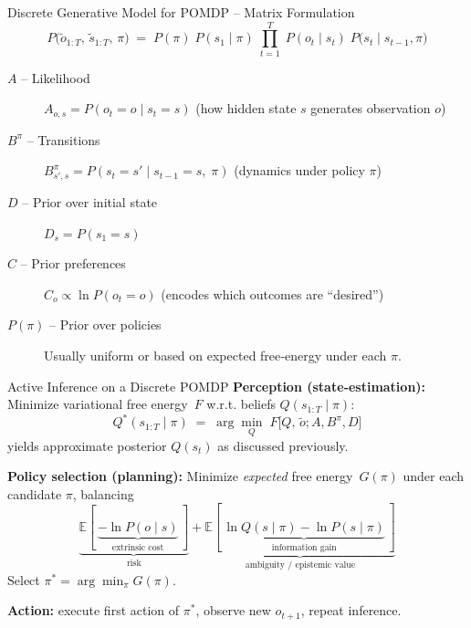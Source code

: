 \documentclass[aspectratio=1610, english]{beamer}
\begin{document}
\begin{frame}{Discrete Generative Model for POMDP -- Matrix Formulation}
\[
  P\bigl(\tilde o_{1:T},\,\tilde s_{1:T},\,\pi\bigr)
    \;=\;P(\pi)\;P(s_1\mid\pi)\;\prod_{t=1}^T
       \;P(o_t\mid s_t)\;P\bigl(s_t\mid s_{t-1},\pi\bigr)
\]
\medskip

\begin{description}
  \item[\(A\) – Likelihood]  
    \(A_{o,s} = P(o_t = o\mid s_t = s)\)  
    (how hidden state \(s\) generates observation \(o\))
  \item[\(B^\pi\) – Transitions]  
    \(B^\pi_{s',s} = P(s_t = s'\mid s_{t-1} = s,\;\pi)\)  
    (dynamics under policy \(\pi\))
  \item[\(D\) – Prior over initial state]  
    \(D_{s} = P(s_1 = s)\)
  \item[\(C\) – Prior preferences]  
    \(C_{o}\propto \ln P(o_t = o)\)  
    (encodes which outcomes are “desired”)
  \item[\(P(\pi)\) – Prior over policies]  
    Usually uniform or based on expected free‐energy under each \(\pi\).
\end{description}
\end{frame}

\begin{frame}{Active Inference on a Discrete POMDP}
\textbf{Perception (state‑estimation):}  
Minimize variational free energy \(F\) w.r.t. beliefs \(Q(s_{1:T}\!\mid\!\pi)\):
\[
  Q^*(s_{1:T}\!\mid\!\pi)
  \;=\;\arg\min_{Q}\;F\bigl[Q,\,\tilde o;A,B^\pi,D\bigr]
\]
yields approximate posterior \(Q(s_t)\) as discussed previously.

\medskip
\textbf{Policy selection (planning):}  
Minimize \emph{expected} free energy \(G(\pi)\) under each candidate \(\pi\),
balancing
\[
  \underbrace{\mathbb{E}[\,\underbrace{-\ln P(o\mid s)}_{\text{extrinsic cost}}\,]}_{\text{risk}}
  + 
  \underbrace{\mathbb{E}[\,\underbrace{\ln Q(s\mid\pi) - \ln P(s\mid\pi)}_{\text{information gain}}\,]}_{\text{ambiguity / epistemic value}}
\]
Select  
\(\displaystyle \pi^* = \arg\min_\pi G(\pi)\).

\medskip
\textbf{Action:} execute first action of \(\pi^*\), observe new \(o_{t+1}\), repeat inference.
\end{frame}
\end{document}
